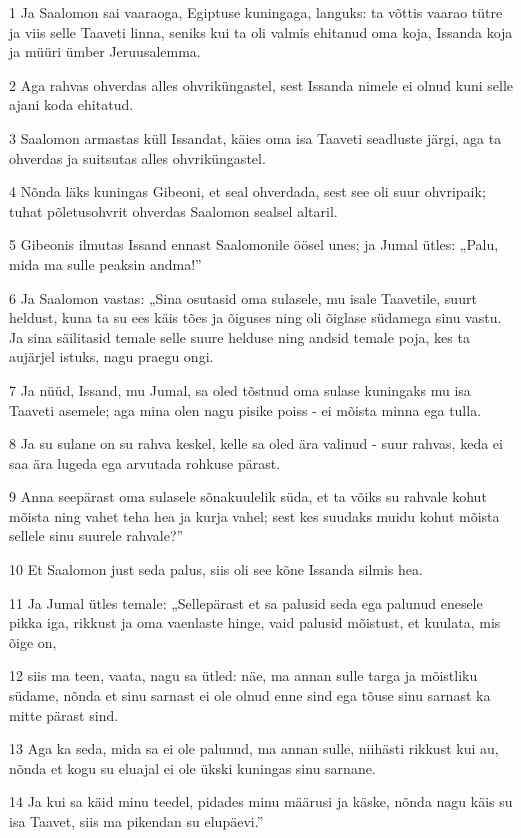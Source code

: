 \par 1 Ja Saalomon sai vaaraoga, Egiptuse kuningaga, languks: ta võttis vaarao tütre ja viis selle Taaveti linna, seniks kui ta oli valmis ehitanud oma koja, Issanda koja ja müüri ümber Jeruusalemma.
\par 2 Aga rahvas ohverdas alles ohvriküngastel, sest Issanda nimele ei olnud kuni selle ajani koda ehitatud.
\par 3 Saalomon armastas küll Issandat, käies oma isa Taaveti seadluste järgi, aga ta ohverdas ja suitsutas alles ohvriküngastel.
\par 4 Nõnda läks kuningas Gibeoni, et seal ohverdada, sest see oli suur ohvripaik; tuhat põletusohvrit ohverdas Saalomon sealsel altaril.
\par 5 Gibeonis ilmutas Issand ennast Saalomonile öösel unes; ja Jumal ütles: „Palu, mida ma sulle peaksin andma!”
\par 6 Ja Saalomon vastas: „Sina osutasid oma sulasele, mu isale Taavetile, suurt heldust, kuna ta su ees käis tões ja õiguses ning oli õiglase südamega sinu vastu. Ja sina säilitasid temale selle suure helduse ning andsid temale poja, kes ta aujärjel istuks, nagu praegu ongi.
\par 7 Ja nüüd, Issand, mu Jumal, sa oled tõstnud oma sulase kuningaks mu isa Taaveti asemele; aga mina olen nagu pisike poiss - ei mõista minna ega tulla.
\par 8 Ja su sulane on su rahva keskel, kelle sa oled ära valinud - suur rahvas, keda ei saa ära lugeda ega arvutada rohkuse pärast.
\par 9 Anna seepärast oma sulasele sõnakuulelik süda, et ta võiks su rahvale kohut mõista ning vahet teha hea ja kurja vahel; sest kes suudaks muidu kohut mõista sellele sinu suurele rahvale?”
\par 10 Et Saalomon just seda palus, siis oli see kõne Issanda silmis hea.
\par 11 Ja Jumal ütles temale: „Sellepärast et sa palusid seda ega palunud enesele pikka iga, rikkust ja oma vaenlaste hinge, vaid palusid mõistust, et kuulata, mis õige on,
\par 12 siis ma teen, vaata, nagu sa ütled: näe, ma annan sulle targa ja mõistliku südame, nõnda et sinu sarnast ei ole olnud enne sind ega tõuse sinu sarnast ka mitte pärast sind.
\par 13 Aga ka seda, mida sa ei ole palunud, ma annan sulle, niihästi rikkust kui au, nõnda et kogu su eluajal ei ole ükski kuningas sinu sarnane.
\par 14 Ja kui sa käid minu teedel, pidades minu määrusi ja käske, nõnda nagu käis su isa Taavet, siis ma pikendan su elupäevi.”
